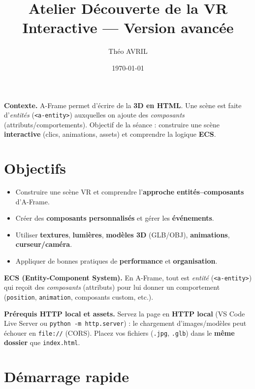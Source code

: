 \documentclass[12pt]{article}
\title{Atelier Découverte de la VR Interactive — Version avancée}
\author{Théo AVRIL}
\date{\today}
\begin{document}
\maketitle

\begin{concept}
\textbf{Contexte.} A-Frame permet d’écrire de la \textbf{3D en HTML}. Une scène est faite d’\textit{entités} (\texttt{<a-entity>}) auxquelles on ajoute des \textit{composants} (attributs/comportements).
Objectif de la séance : construire une scène \textbf{interactive} (clics, animations, assets) et comprendre la logique \textbf{ECS}.
\end{concept}

\section{Objectifs}
\begin{itemize}
    \item Construire une scène VR et comprendre l'\textbf{approche entités--composants} d'A-Frame.
    \item Créer des \textbf{composants personnalisés} et gérer les \textbf{événements}.
    \item Utiliser \textbf{textures}, \textbf{lumières}, \textbf{modèles 3D} (GLB/OBJ), \textbf{animations}, \textbf{curseur/caméra}.
    \item Appliquer de bonnes pratiques de \textbf{performance} et \textbf{organisation}.
\end{itemize}

\begin{concept}
\textbf{ECS (Entity-Component System).} En A-Frame, tout est \textit{entité} (\texttt{<a-entity>}) qui reçoit des \textit{composants} (attributs) pour lui donner un comportement (\texttt{position}, \texttt{animation}, composants custom, etc.).
\end{concept}

\begin{concept}
\textbf{Prérequis HTTP local et assets.} Servez la page en \textbf{HTTP local} (VS Code Live Server ou \texttt{python -m http.server}) : le chargement d'images/modèles peut échouer en \texttt{file://} (CORS). Placez vos fichiers (\texttt{.jpg}, \texttt{.glb}) dans le \textbf{même dossier} que \texttt{index.html}.
\end{concept}

\section{Démarrage rapide}
\end{document}
